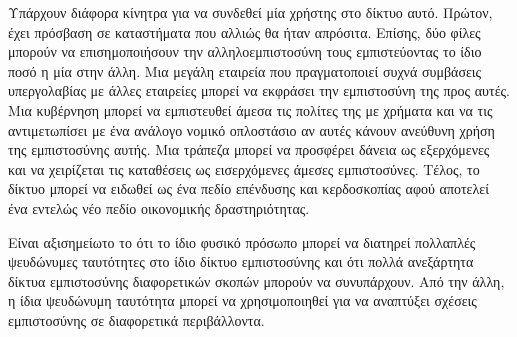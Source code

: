   Υπάρχουν διάφορα κίνητρα για να συνδεθεί μία χρήστης στο δίκτυο αυτό. Πρώτον, έχει πρόσβαση σε καταστήματα που αλλιώς θα
  ήταν απρόσιτα. Επίσης, δύο φίλες μπορούν να επισημοποιήσουν την αλληλοεμπιστοσύνη τους εμπιστεύοντας το ίδιο ποσό η μία
  στην άλλη. Μια μεγάλη εταιρεία που πραγματοποιεί συχνά συμβάσεις υπεργολαβίας με άλλες εταιρείες μπορεί να εκφράσει την
  εμπιστοσύνη της προς αυτές. Μια κυβέρνηση μπορεί να εμπιστευθεί άμεσα τις πολίτες της με χρήματα και να τις αντιμετωπίσει
  με ένα ανάλογο νομικό οπλοστάσιο αν αυτές κάνουν ανεύθυνη χρήση της εμπιστοσύνης αυτής. Μια τράπεζα μπορεί να προσφέρει
  δάνεια ως εξερχόμενες και να χειρίζεται τις καταθέσεις ως εισερχόμενες άμεσες εμπιστοσύνες. Τέλος, το δίκτυο μπορεί να
  ειδωθεί ως ένα πεδίο επένδυσης και κερδοσκοπίας αφού αποτελεί ένα εντελώς νέο πεδίο οικονομικής δραστηριότητας.

  Είναι αξισημείωτο το ότι το ίδιο φυσικό πρόσωπο μπορεί να διατη\-ρεί πολλαπλές ψευδώνυμες ταυτότητες στο ίδιο δίκτυο
  εμπιστοσύνης και ότι πολλά ανεξάρτητα δίκτυα εμπιστοσύνης διαφορετικών σκοπών μπορούν να συνυπάρχουν. Από την άλλη, η ίδια
  ψευδώνυμη ταυτότητα μπορεί να χρησιμοποιηθεί για να αναπτύξει σχέσεις εμπιστοσύνης σε διαφορετικά περιβάλλοντα.
